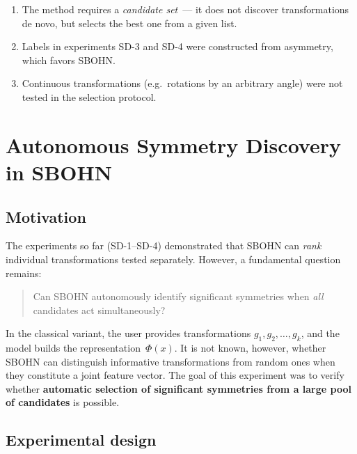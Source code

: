 \documentclass[11pt,a4paper]{report}
\begin{document}
\begin{enumerate}
\item The method requires a \emph{candidate set}~--- it does not discover transformations de novo, but selects the best one from a given list.
\item Labels in experiments SD-3 and SD-4 were constructed from asymmetry, which favors SBOHN.
\item Continuous transformations (e.g.\ rotations by an arbitrary angle) were not tested in the selection protocol.
\end{enumerate}




\section{Autonomous Symmetry Discovery in SBOHN}\label{sec:asd}

\subsection{Motivation}

The experiments so far (SD-1--SD-4) demonstrated that SBOHN can \emph{rank} individual transformations tested separately.
However, a fundamental question remains:

\begin{quote}
Can SBOHN autonomously identify significant symmetries when \emph{all} candidates act simultaneously?
\end{quote}

In the classical variant, the user provides transformations
$g_1,g_2,\ldots,g_k$,
and the model builds the representation~$\Phi(x)$.
It is not known, however, whether SBOHN can distinguish informative transformations from random ones when they constitute a joint feature vector.
The goal of this experiment was to verify whether \textbf{automatic selection of significant symmetries from a large pool of candidates} is possible.

\subsection{Experimental design}
\end{document}
